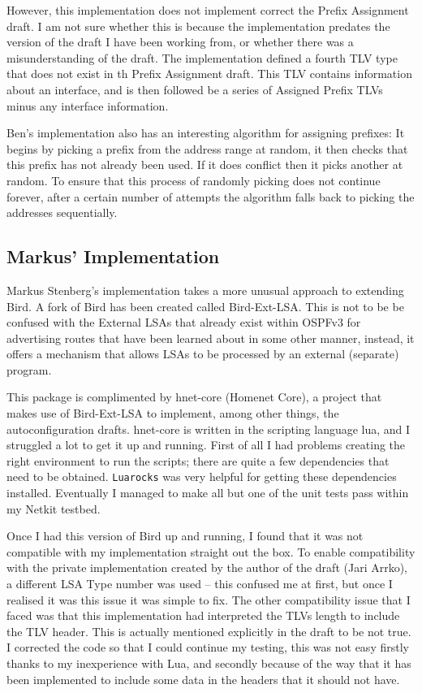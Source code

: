 \documentclass[12pt]{report}
\begin{document}
However, this implementation does not implement correct the Prefix Assignment
draft. I am not sure whether this is because the implementation predates the
version of the draft I have been working from, or whether there was a
misunderstanding of the draft. The implementation defined a fourth TLV type
that does not exist in th Prefix Assignment draft. This TLV contains information
about an interface, and is then followed be a series of Assigned Prefix TLVs
minus any interface information. 

Ben's implementation also has an interesting algorithm for assigning prefixes:
It begins by picking a prefix from the address range at random, it then checks
that this prefix has not already been used. If it does conflict then it picks
another at random. To ensure that this process of randomly picking does not
continue forever, after a certain number of attempts the algorithm falls back
to picking the addresses sequentially. 

\subsection{Markus' Implementation}
Markus Stenberg's implementation takes a more unusual approach to extending
Bird. A fork of Bird has been created called Bird-Ext-LSA\@. This is not to be
be confused with the External LSAs that already exist within OSPFv3 for
advertising routes that have been learned about in some other manner, instead,
it offers a mechanism that allows LSAs to be processed by an external
(separate) program. 

This package is complimented by hnet-core (Homenet Core), a project that makes
use of Bird-Ext-LSA to implement, among other things, the autoconfiguration
drafts\@. hnet-core is written in the scripting language lua, and I struggled a
lot to get it up and running. First of all I had problems creating the right
environment to run the scripts; there are quite a few dependencies that need to
be obtained. \texttt{Luarocks} was very helpful for getting these dependencies
installed. Eventually I managed to make all but one of the unit tests pass
within my Netkit testbed.

Once I had this version of Bird up and running, I found that it was not
compatible with my implementation straight out the box. To enable compatibility
with the private implementation created by the author of the draft (Jari Arrko),
a different LSA Type number was used -- this confused me at first, but once I
realised it was this issue it was simple to fix. The other compatibility issue
that I faced was that this implementation had interpreted the TLVs length to
include the TLV header. This is actually mentioned explicitly in the draft to
be not true. I corrected the code so that I could continue my testing, this was
not easy firstly thanks to my inexperience with Lua, and secondly because of
the way that it has been implemented to include some data in the headers that
it should not have.  
\end{document}
